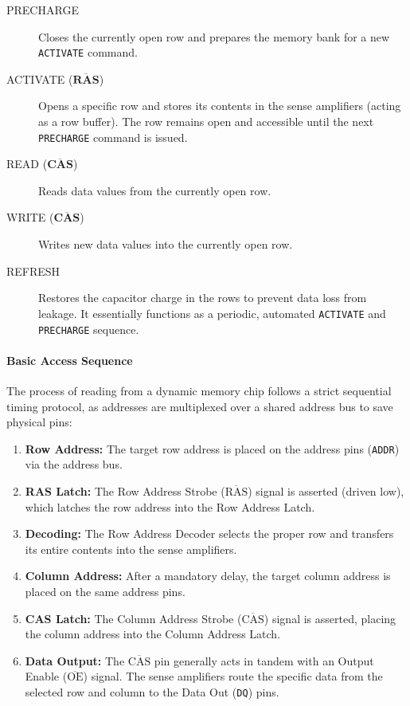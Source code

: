 \begin{description}
    \item[PRECHARGE] Closes the currently open row and prepares the memory bank for a new \texttt{ACTIVATE} command.
    \item[ACTIVATE (\(\overline{\textbf{RAS}}\))] Opens a specific row and stores its contents in the sense amplifiers (acting as a row buffer). The row remains open and accessible until the next \texttt{PRECHARGE} command is issued.
    \item[READ (\(\overline{\textbf{CAS}}\))] Reads data values from the currently open row.
    \item[WRITE (\(\overline{\textbf{CAS}}\))] Writes new data values into the currently open row.
    \item[REFRESH] Restores the capacitor charge in the rows to prevent data loss from leakage. It essentially functions as a periodic, automated \texttt{ACTIVATE} and \texttt{PRECHARGE} sequence.
\end{description}

\paragraph{Basic  Access Sequence}
The process of reading from a dynamic memory chip follows a strict sequential timing protocol, as addresses are multiplexed over a shared address bus to save physical pins:

\begin{enumerate}
    \item \textbf{Row Address:} The target row address is placed on the address pins (\texttt{ADDR}) via the address bus.
    \item \textbf{RAS Latch:} The Row Address Strobe (\(\overline{\text{RAS}}\)) signal is asserted (driven low), which latches the row address into the Row Address Latch.
    \item \textbf{Decoding:} The Row Address Decoder selects the proper row and transfers its entire contents into the sense amplifiers.
    \item \textbf{Column Address:} After a mandatory delay, the target column address is placed on the same address pins.
    \item \textbf{CAS Latch:} The Column Address Strobe (\(\overline{\text{CAS}}\)) signal is asserted, placing the column address into the Column Address Latch.
    \item \textbf{Data Output:} The \(\overline{\text{CAS}}\) pin generally acts in tandem with an Output Enable (\(\overline{\text{OE}}\)) signal. The sense amplifiers route the specific data from the selected row and column to the Data Out (\texttt{DQ}) pins.
\end{enumerate}


